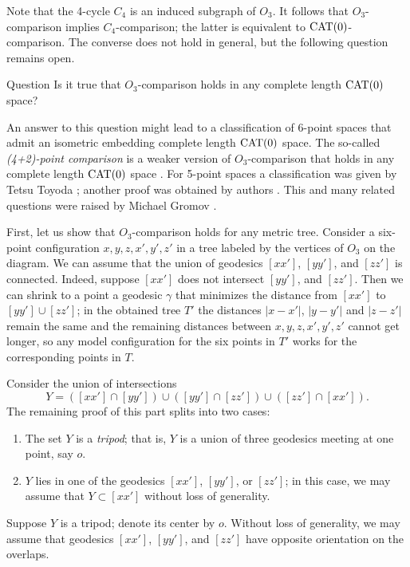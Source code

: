 \documentclass{article}
\begin{document}
Note that the 4-cycle $C_4$ is an induced subgraph of $O_3$.
It follows that $O_3$-comparison implies $C_4$-comparison;
the latter is equivalent to $\mathrm{CAT}(0)$-comparison.
The converse does not hold in general, but the following question remains open.

\begin{thm}{Question}
Is it true that $O_3$-comparison holds in any complete length $\mathrm{CAT}(0)$ space?
\end{thm}

An answer to this question might lead to a classification of 6-point spaces that admit an isometric embedding complete length $\mathrm{CAT}(0)$ space.
The so-called \emph{(4+2)-point comparison} is a weaker version of $O_3$-comparison that holds in any complete length $\mathrm{CAT}(0)$ space \cite{AKP-Kirszbraun,alexander2019alexandrov}.
For 5-point spaces a classification was given by Tetsu Toyoda \cite{toyoda};
another proof was obtained by authors \cite{lebedeva-petrunin}.
This and many related questions were raised by Michael Gromov \cite[1.19$_+(e)$]{gromov}.

First, let us show that $O_3$-comparison holds for any metric tree.
Consider a six-point configuration $x,y,z,x',y',z'$ in a tree labeled by the vertices of $O_3$ on the diagram.
We can assume that the union of geodesics $[xx']$, $[yy']$, and $[zz']$ is connected.
Indeed, suppose $[xx']$ does not intersect $[yy']$, and $[zz']$.
Then we can shrink to a point a geodesic $\gamma$ that minimizes the distance from $[xx']$ to $[yy']\cup[zz']$;
in the obtained tree $T'$ the distances $|x-x'|$, $|y-y'|$ and $|z-z'|$ remain the same and the remaining distances between $x,y,z,x',y',z'$ cannot get longer, so any model configuration for the six points in $T'$ works for the corresponding points in $T$.

Consider the union of intersections 
\[Y=([xx']\cap [yy'])\cup([yy']\cap [zz'])\cup([zz']\cap [xx']).\]
The remaining proof of this part splits into two cases:
\begin{enumerate}
\item The set $Y$ is a \emph{tripod}; that is, $Y$ is a union of three geodesics meeting at one point, say $o$.
\item $Y$ lies in one of the  geodesics $[xx']$, $[yy']$, or $[zz']$; in this case, we may assume that $Y\subset [xx']$ without loss of generality.
\end{enumerate}

Suppose $Y$ is a tripod; denote its center by $o$.
Without loss of generality, we may assume that geodesics $[xx']$, $[yy']$, and $[zz']$ have opposite orientation on the overlaps.
\end{document}
